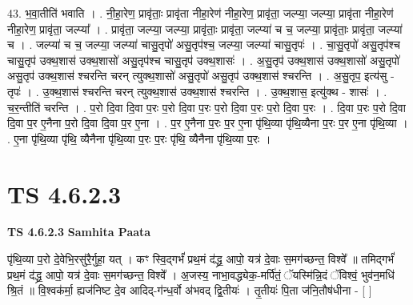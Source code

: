 \documentclass[17pt]{extarticle}
\begin{document}
43. भ॒वा॒तीति॑ भवाति । . नी॒हा॒रेण॒ प्रावृ॑ताः॒ प्रावृ॑ता नीहा॒रेण॑ नीहा॒रेण॒ प्रावृ॑ता॒ जल्प्या॒ जल्प्या॒ प्रावृ॑ता नीहा॒रेण॑ नीहा॒रेण॒ प्रावृ॑ता॒ जल्प्या᳚ । . प्रावृ॑ता॒ जल्प्या॒ जल्प्या॒ प्रावृ॑ताः॒ प्रावृ॑ता॒ जल्प्या॑ च च॒ जल्प्या॒ प्रावृ॑ताः॒ प्रावृ॑ता॒ जल्प्या॑ च । . जल्प्या॑ च च॒ जल्प्या॒ जल्प्या॑ चासु॒तृपो॑ असु॒तृप॑श्च॒ जल्प्या॒ जल्प्या॑ चासु॒तृपः॑ । . चा॒सु॒तृपो॑ असु॒तृप॑श्च चासु॒तृप॑ उक्थ॒शास॑ उक्थ॒शासो॑ असु॒तृप॑श्च चासु॒तृप॑ उक्थ॒शासः॑ । . अ॒सु॒तृप॑ उक्थ॒शास॑ उक्थ॒शासो॑ असु॒तृपो॑ असु॒तृप॑ उक्थ॒शास॑ श्चरन्ति चरन् त्युक्थ॒शासो॑ असु॒तृपो॑ असु॒तृप॑ उक्थ॒शास॑ श्चरन्ति । . अ॒सु॒तृप॒ इत्य॑सु - तृपः॑ । . उ॒क्थ॒शास॑ श्चरन्ति चरन् त्युक्थ॒शास॑ उक्थ॒शास॑ श्चरन्ति । . उ॒क्थ॒शास॒ इत्यु॑क्थ - शासः॑ । . च॒र॒न्तीति॑ चरन्ति । . प॒रो दि॒वा दि॒वा प॒रः प॒रो दि॒वा प॒रः प॒रो दि॒वा प॒रः प॒रो दि॒वा प॒रः । . दि॒वा प॒रः प॒रो दि॒वा दि॒वा प॒र ए॒नैना प॒रो दि॒वा दि॒वा प॒र ए॒ना । . प॒र ए॒नैना प॒रः प॒र ए॒ना पृ॑थि॒व्या पृ॑थि॒व्यैना प॒रः प॒र ए॒ना पृ॑थि॒व्या । . ए॒ना पृ॑थि॒व्या पृ॑थि॒ व्यैनैना पृ॑थि॒व्या प॒रः प॒रः पृ॑थि॒ व्यैनैना पृ॑थि॒व्या प॒रः । \newline
\pagebreak
{}

\section{ TS 4.6.2.3 }

\textbf{TS 4.6.2.3 } \newline
\textbf{Samhita Paata} \newline

पृ॑थि॒व्या प॒रो दे॒वेभि॒रसु॑रै॒र्गुहा॒ यत् । कꣳ स्वि॒द्गर्भं॑ प्रथ॒मं द॑द्ध्र॒ आपो॒ यत्र॑ दे॒वाः स॒मग॑च्छन्त॒ विश्वे᳚ ॥ तमिद्गर्भं॑ प्रथ॒मं द॑द्ध्र॒ आपो॒ यत्र॑ दे॒वाः स॒मग॑च्छन्त॒ विश्वे᳚ । अ॒जस्य॒ नाभा॒वद्ध्येक॒-मर्पि॑तं॒ ॅयस्मि॑न्नि॒दं ॅविश्वं॒ भुव॑न॒मधि॑ श्रि॒तं ॥ वि॒श्वक॑र्मा॒ ह्यज॑निष्ट दे॒व आदिद्-ग॑न्ध॒र्वो अ॑भवद् द्वि॒तीयः॑ । तृ॒तीयः॑ पि॒ता ज॑नि॒तौष॑धीना - [  ] \newline
\end{document}
